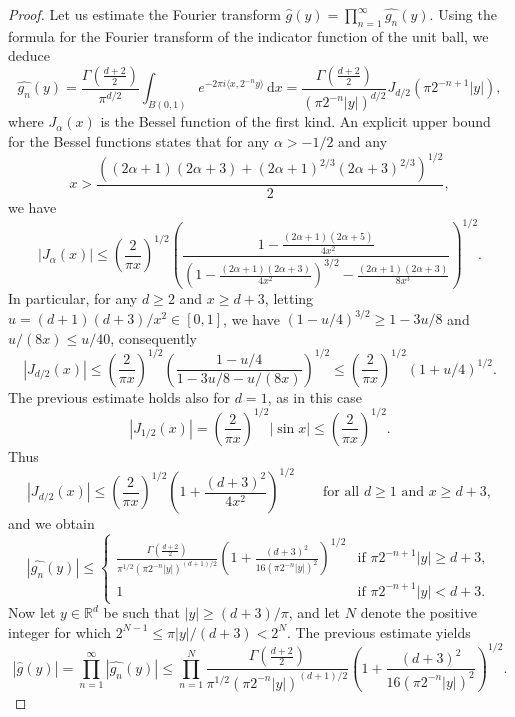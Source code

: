\documentclass[11pt,a4paper]{article}
\theoremstyle{definition}
\begin{document}
\begin{proof}
Let us estimate the Fourier transform $\widehat{g}(y) = \prod_{n=1}^{\infty} \widehat{g_n}(y)$. Using the formula for the Fourier transform of the indicator function of the unit ball, we deduce
\[ \widehat{g_n}(y)= \frac{\Gamma \left( \frac{d+2}{2} \right)}{\pi^{d/2}} \int_{B(0,1)} e^{-2 \pi i \langle x, 2^{-n}y \rangle} \, \mathrm{d}x = \frac{\Gamma \left( \frac{d+2}{2} \right)}{\left( \pi 2^{-n} |y| \right)^{d/2}} J_{d/2} (\pi 2^{-n+1} |y|) , \]
where $J_{\alpha}(x)$ is the Bessel function of the first kind. An explicit upper bound for the Bessel functions \cite[Theorem 2]{KR1} states that for any $\alpha>-1/2$ and any
\[ x> \frac{((2 \alpha+1)(2 \alpha +3) + (2 \alpha+1)^{2/3}(2 \alpha+3)^{2/3})^{1/2}}{2}, \]
we have
\[ |J_{\alpha}(x)| \le \left( \frac{2}{\pi x} \right)^{1/2} \left( \frac{1-\frac{(2 \alpha+1)(2 \alpha+5)}{4x^2}}{\left( 1-\frac{(2 \alpha+1)(2 \alpha+3)}{4x^2} \right)^{3/2} - \frac{(2 \alpha+1)(2\alpha+3)}{8 x^3}} \right)^{1/2} . \]
In particular, for any $d \ge 2$ and $x \ge d+3$, letting $u=(d+1)(d+3)/x^2 \in [0,1]$, we have $(1-u/4)^{3/2} \ge 1-3u/8$ and $u/(8x) \le u/40$, consequently
\[ |J_{d/2}(x)| \le \left( \frac{2}{\pi x} \right)^{1/2} \left( \frac{1-u/4}{1-3u/8 - u/(8x)} \right)^{1/2} \le \left( \frac{2}{\pi x} \right)^{1/2} \left( 1+u/4 \right)^{1/2} . \]
The previous estimate holds also for $d=1$, as in this case
\begin{equation}\label{J1/2estimate}
|J_{1/2}(x)| = \left( \frac{2}{\pi x} \right)^{1/2} |\sin x| \le \left( \frac{2}{\pi x} \right)^{1/2} .
\end{equation}
Thus
\[ |J_{d/2}(x)| \le \left( \frac{2}{\pi x} \right)^{1/2} \left( 1+\frac{(d+3)^2}{4x^2} \right)^{1/2} \qquad \textrm{for all } d \ge 1 \textrm{ and } x \ge d+3 , \]
and we obtain
\[ |\widehat{g_n}(y)| \le \left\{ \begin{array}{ll} \displaystyle{\frac{\Gamma \left( \frac{d+2}{2} \right)}{\pi^{1/2} \left( \pi 2^{-n} |y| \right)^{(d+1)/2}} \left(1+\frac{(d+3)^2}{16 (\pi 2^{-n}|y|)^2} \right)^{1/2}} & \textrm{if } \pi 2^{-n+1} |y| \ge d+3, \\ 1 & \textrm{if } \pi 2^{-n+1} |y| < d+3 . \end{array} \right. \]
Now let $y \in \mathbb{R}^d$ be such that $|y|\ge (d+3)/\pi$, and let $N$ denote the positive integer for which $2^{N-1} \le \pi |y|/(d+3) < 2^N$. The previous estimate yields
\[ |\widehat{g}(y)| = \prod_{n=1}^{\infty} |\widehat{g_n}(y)| \le \prod_{n=1}^N \frac{\Gamma \left( \frac{d+2}{2} \right)}{\pi^{1/2} \left( \pi 2^{-n} |y| \right)^{(d+1)/2}} \left(1+\frac{(d+3)^2}{16 (\pi 2^{-n}|y|)^2} \right)^{1/2} . \]

\end{proof}
\end{document}
